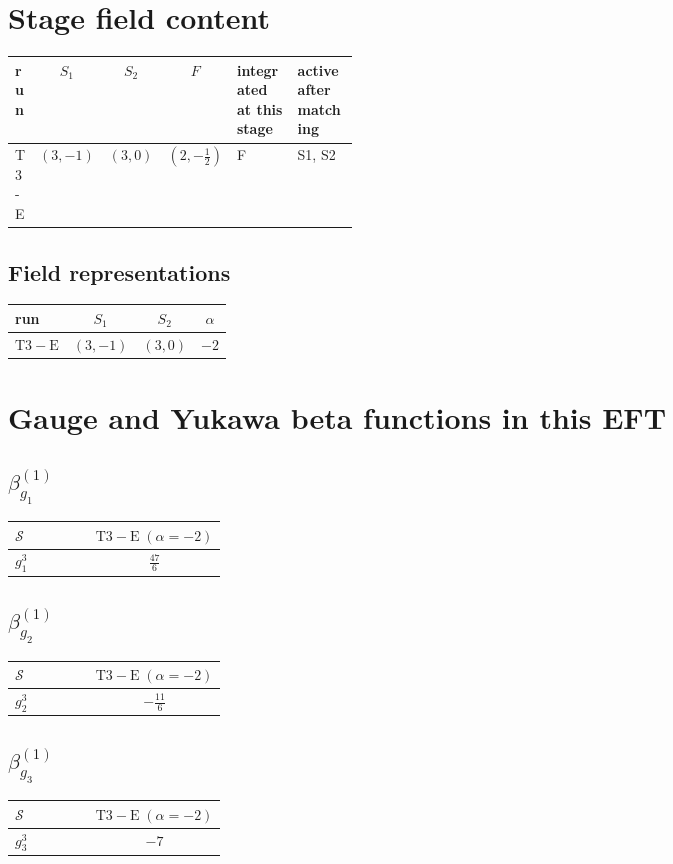 \documentclass[9pt]{article}
\begin{document}
\section*{Stage field content}
\begin{longtable}{@{}lccc p{0.20\linewidth}p{0.20\linewidth}@{}}
\toprule
run & $S_1$ & $S_2$ & $F$ & integrated at this stage & active after matching \\
\midrule
T3-E & $(3,-1)$ & $(3,0)$ & $(2,- \frac{1}{2})$ & F & S1, S2 \\
\bottomrule
\end{longtable}
\subsection*{Field representations}
\begin{longtable}{@{}lccc@{}}
\toprule
run & $S_1$ & $S_2$ & $\alpha$ \\
\midrule
$\mathrm{T3-E}$ & $(3,-1)$ & $(3,0)$ & $-2$ \\
\bottomrule
\end{longtable}
\section*{Gauge and Yukawa beta functions in this EFT}
\subsection*{$ \beta_{g_1}^{(1)} $}
\begin{longtable}{@{}p{0.38\linewidth}c@{}}
\toprule
$\mathcal{S}$ & $ \mathrm{T3-E}\;(\alpha=-2) $ \\
\midrule
$ g_1^3 $ & $ \frac{47}{6} $ \\
\bottomrule
\end{longtable}
\subsection*{$ \beta_{g_2}^{(1)} $}
\begin{longtable}{@{}p{0.38\linewidth}c@{}}
\toprule
$\mathcal{S}$ & $ \mathrm{T3-E}\;(\alpha=-2) $ \\
\midrule
$ g_2^3 $ & $ - \frac{11}{6} $ \\
\bottomrule
\end{longtable}
\subsection*{$ \beta_{g_3}^{(1)} $}
\begin{longtable}{@{}p{0.38\linewidth}c@{}}
\toprule
$\mathcal{S}$ & $ \mathrm{T3-E}\;(\alpha=-2) $ \\
\midrule
$ g_3^3 $ & $ -7 $ \\
\bottomrule
\end{longtable}
\end{document}
